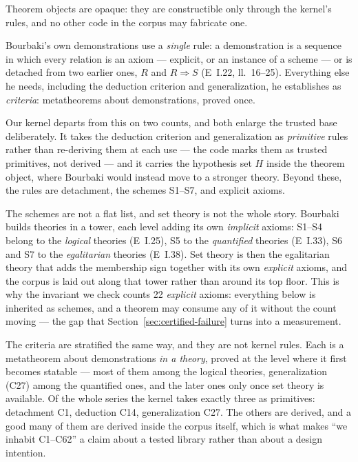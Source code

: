 \documentclass[11pt]{article}
\theoremstyle{remark}\newtheorem{example}{Example}
\begin{document}
Theorem objects are opaque: they are constructible only through the kernel's rules,
and no other code in the corpus may fabricate one.

Bourbaki's own demonstrations use a \emph{single} rule: a demonstration is a sequence
in which every relation is an axiom --- explicit, or an instance of a scheme --- or is
detached from two earlier ones, $R$ and $R \Rightarrow S$ (E~I.22, ll.~16--25).
Everything else he needs, including the deduction criterion and generalization, he
establishes as \emph{criteria}: metatheorems about demonstrations, proved once.

Our kernel departs from this on two counts, and both enlarge the trusted base
deliberately. It takes the deduction criterion and generalization as \emph{primitive}
rules rather than re-deriving them at each use --- the code marks them as trusted
primitives, not derived --- and it carries the hypothesis set $H$ inside the theorem
object, where Bourbaki would instead move to a stronger theory. Beyond these, the rules
are detachment, the schemes S1--S7, and explicit axioms.

The schemes are not a flat list, and set theory is not the whole story. Bourbaki builds
theories in a tower, each level adding its own \emph{implicit} axioms: S1--S4 belong to
the \emph{logical} theories (E~I.25), S5 to the \emph{quantified} theories (E~I.33),
S6 and S7 to the \emph{egalitarian} theories (E~I.38). Set theory is then the
egalitarian theory that adds the membership sign together with its own \emph{explicit}
axioms, and the corpus is laid out along that tower rather than around its top floor.
This is why the invariant we check counts 22 \emph{explicit} axioms: everything below
is inherited as schemes, and a theorem may consume any of it without the count moving
--- the gap that Section~\ref{sec:certified-failure} turns into a measurement.

The criteria are stratified the same way, and they are not kernel rules. Each
is a metatheorem about demonstrations \emph{in a theory}, proved at the level where it
first becomes statable --- most of them among the logical theories, generalization
(C27) among the quantified ones, and the later ones only once set theory is available.
Of the whole series the kernel takes exactly three as primitives: detachment C1,
deduction C14, generalization C27. The others are derived, and a good many of them are
derived inside the corpus itself, which is what makes ``we inhabit C1--C62'' a claim
about a tested library rather than about a design intention.
\end{document}
